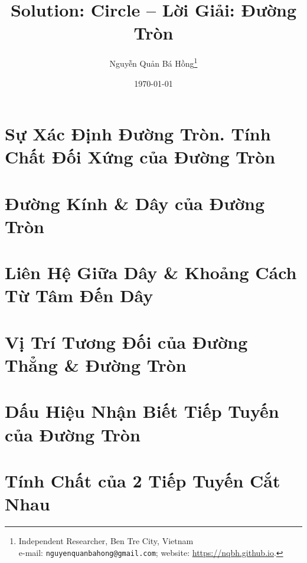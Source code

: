 \documentclass{article}
\title{Solution: Circle -- Lời Giải: Đường Tròn}
\author{Nguyễn Quản Bá Hồng\footnote{Independent Researcher, Ben Tre City, Vietnam\\e-mail: \texttt{nguyenquanbahong@gmail.com}; website: \url{https://nqbh.github.io}.}}
\date{\today}
\begin{document}
\maketitle
\begin{abstract}
	
\end{abstract}
\tableofcontents


\section{Sự Xác Định Đường Tròn. Tính Chất Đối Xứng của Đường Tròn}


\section{Đường Kính \& Dây của Đường Tròn}


\section{Liên Hệ Giữa Dây \& Khoảng Cách Từ Tâm Đến Dây}


\section{Vị Trí Tương Đối của Đường Thẳng \& Đường Tròn}


\section{Dấu Hiệu Nhận Biết Tiếp Tuyến của Đường Tròn}


\section{Tính Chất của 2 Tiếp Tuyến Cắt Nhau}
\end{document}

